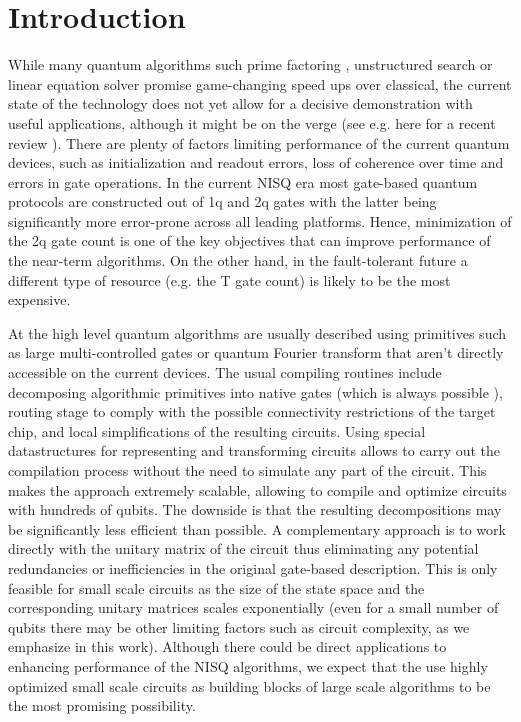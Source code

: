 \documentclass[amsfonts, amssymb, aps, nofootinbib, twocolumn]{revtex4-2}
\newcommand{\T}{T }
\begin{document}
\section{Introduction}
While many quantum algorithms such prime factoring \cite{Shor1997}, unstructured search \cite{Grover1997} or linear equation solver \cite{Harrow2009} promise game-changing speed ups over classical, the current state of the technology does not yet allow for a decisive demonstration with useful applications, although it might be on the verge (see e.g. here for a recent review \cite{Fedorov2022}). There are plenty of factors limiting performance of the current quantum devices, such as initialization and readout errors, loss of coherence over time and errors in gate operations. In the current NISQ era \cite{Preskill2018} most gate-based quantum protocols are constructed out of 1q and 2q gates with the latter being significantly more error-prone across all leading platforms. Hence, minimization of the 2q gate count is one of the key objectives that can improve performance of the near-term algorithms. On the other hand, in the fault-tolerant future a different type of resource (e.g. the \T gate count) is likely to be the most expensive.

At the high level quantum algorithms are usually described using primitives such as large multi-controlled gates or quantum Fourier transform that aren't directly accessible on the current devices. The usual compiling routines \cite{Qiskit, Sivarajah2021} include decomposing algorithmic primitives into native gates (which is always possible \cite{Barenco1995}), routing stage to comply with the possible connectivity restrictions of the target chip, and local simplifications of the resulting circuits. Using special datastructures for representing and transforming circuits allows to carry out the compilation process without the need to simulate any part of the circuit. This makes the approach extremely scalable, allowing to compile and optimize circuits with hundreds of qubits. The downside is that the resulting decompositions may be significantly less efficient than possible. A complementary approach is to work directly with the unitary matrix of the circuit thus eliminating any potential redundancies or inefficiencies in the original gate-based description. This is only feasible for small scale circuits as the size of the state space and the corresponding unitary matrices scales exponentially (even for a small number of qubits there may be other limiting factors such as circuit complexity, as we emphasize in this work). Although there could be direct applications to enhancing performance of the NISQ algorithms, we expect that the use highly optimized small scale circuits as building blocks of large scale algorithms to be the most promising possibility.
\end{document}
